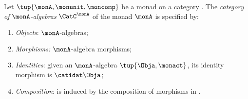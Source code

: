 \begin{ctdefinition}
    \label{def:catofmonadalgebras}
    Let $\tup{\monA, \monunit, \moncomp}$ be a monad on a category \CatC.
    The \emph{category of $\monA$-algebras} $\CatC^\monA$ of the monad $\monA$ is specified by:
    \begin{enumerate}
        \item \emph{Objects}: $\monA$-algebras;
        \item \emph{Morphisms:} $\monA$-algebra morphisms;
        \item \emph{Identities}: given an $\monA$-algebra $\tup{\Obja, \monact}$, its identity morphism is $\catidat\Obja$;
        \item \emph{Composition}: is induced by the composition of morphisms in \CatC.
    \end{enumerate}
\end{ctdefinition}

